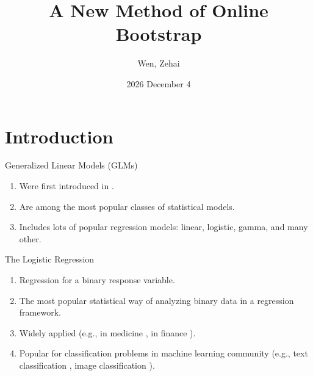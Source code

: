 \documentclass{beamer}
\title{A New Method of Online Bootstrap}
\author{Wen, Zehai}
\institute{McGill University}
\date{2026 December 4}
\begin{document}
\frame{\titlepage}

\begin{frame}
    \tableofcontents
\end{frame}

\section{Introduction}

\begin{frame}
    \tableofcontents[currentsection]
\end{frame}

\begin{frame}{Generalized Linear Models (GLMs)}
    \begin{enumerate}
    \item Were first introduced in \cite{Nelder_Wedderburn_1972}.
    \item Are among the most popular classes of statistical models.
    \item Includes lots of popular regression models: linear, logistic, gamma, and many other.
    \end{enumerate}
\end{frame}

\begin{frame}{The Logistic Regression}
    \begin{enumerate}
    \item Regression for a binary response variable.
    \item The most popular statistical way of analyzing binary data in a regression framework.
    \item Widely applied (e.g., in medicine \citep{Ding_et_al_2025}, in finance \citep{Silva_et_al_2020}).
    \item Popular for classification problems in machine learning community 
    (e.g., text classification \citep{Genkin_et_al_2007}, image classification \citep{Song_2023}).
    \end{enumerate}
    
\end{frame}
\end{document}

